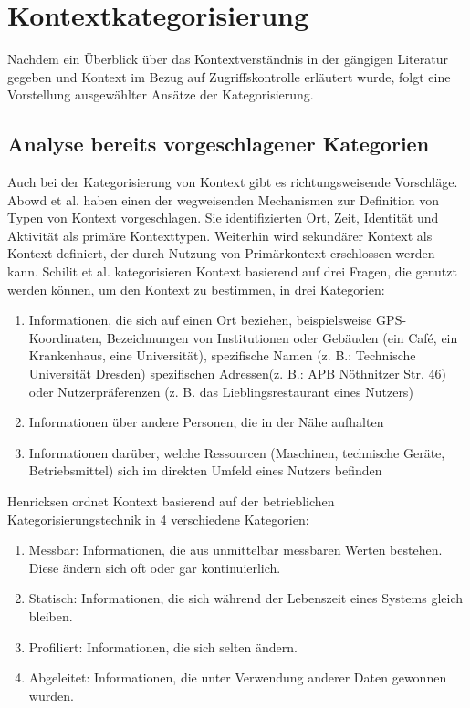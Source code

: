\section{Kontextkategorisierung}
Nachdem ein Überblick über das Kontextverständnis in der gängigen Literatur gegeben und Kontext im Bezug auf Zugriffskontrolle erläutert wurde, folgt eine Vorstellung ausgewählter Ansätze der Kategorisierung.
\subsection{ Analyse bereits vorgeschlagener Kategorien} 
Auch bei der Kategorisierung von Kontext gibt es richtungsweisende Vorschläge. Abowd et al. \cite{abowd_towards_1999} haben einen der wegweisenden Mechanismen zur Definition von Typen von Kontext vorgeschlagen. Sie identifizierten Ort, Zeit, Identität und Aktivität als primäre Kontexttypen. Weiterhin wird sekundärer Kontext als Kontext definiert, der durch Nutzung von Primärkontext erschlossen werden kann. Schilit et al. \cite{schilit_context-aware_1994} kategorisieren Kontext basierend auf drei Fragen, die genutzt werden können, um den Kontext zu bestimmen, in drei Kategorien:
\begin{enumerate}
\item{Informationen, die sich auf einen Ort beziehen, beispielsweise GPS-Koordinaten, Bezeichnungen von Institutionen oder Gebäuden (ein Café, ein Krankenhaus, eine Universität), spezifische Namen (z. B.: Technische Universität Dresden) spezifischen Adressen(z. B.: APB Nöthnitzer Str. 46) oder Nutzerpräferenzen (z. B. das Lieblingsrestaurant eines Nutzers) }
\item{Informationen über andere Personen, die in der Nähe aufhalten}
\item{Informationen darüber, welche Ressourcen (Maschinen, technische Geräte, Betriebsmittel) sich im direkten Umfeld eines Nutzers befinden}
\end{enumerate}
Henricksen \cite{henricksen2003framework} ordnet Kontext basierend auf der betrieblichen Kategorisierungstechnik in 4 verschiedene Kategorien:
\begin{enumerate}
\item {Messbar: Informationen, die aus unmittelbar messbaren Werten bestehen. Diese ändern sich oft oder gar kontinuierlich. }
\item {Statisch: Informationen, die sich während der Lebenszeit eines Systems gleich bleiben.}
\item {Profiliert: Informationen, die sich selten ändern.}
\item {Abgeleitet: Informationen, die unter Verwendung anderer Daten gewonnen wurden. }
\end{enumerate}
